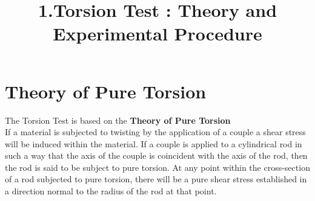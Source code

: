 \documentclass[12pt,a4paper]{article}	%
\title{1.Torsion Test : Theory and Experimental Procedure}
\date{\vspace{-5ex}}	%
\begin{document}
\maketitle
\section{Theory of Pure Torsion}
The Torsion Test is based on the \textbf{Theory of Pure Torsion}\\

If a material is subjected to twisting by the application of a couple a shear stress will be induced within the material. If a couple is applied to a cylindrical rod in such a way that the axis of the couple is coincident with the axis of the rod, then the rod is said to be subject to pure torsion. At any point within the cross-section of a rod subjected to pure torsion, there will be a pure shear stress established in a direction normal to the radius of the rod at that point.\\
\end{document}
